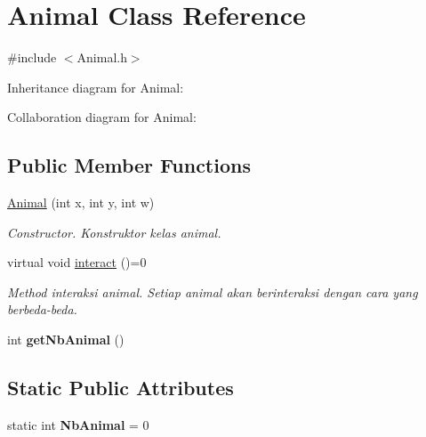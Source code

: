 \hypertarget{classAnimal}{}\section{Animal Class Reference}
\label{classAnimal}


{\ttfamily \#include $<$Animal.\+h$>$}



Inheritance diagram for Animal\+:


Collaboration diagram for Animal\+:
\subsection*{Public Member Functions}
\begin{DoxyCompactItemize}
\item 
\hyperlink{classAnimal_a38f8dc7a0844d03658f0cd5de482a5db}{Animal} (int x, int y, int w)\hypertarget{classAnimal_a38f8dc7a0844d03658f0cd5de482a5db}{}\label{classAnimal_a38f8dc7a0844d03658f0cd5de482a5db}

\begin{DoxyCompactList}\small\item\em Constructor. Konstruktor kelas animal. \end{DoxyCompactList}\item 
virtual void \hyperlink{classAnimal_af47626b050b665e9a19525227d2b840f}{interact} ()=0\hypertarget{classAnimal_af47626b050b665e9a19525227d2b840f}{}\label{classAnimal_af47626b050b665e9a19525227d2b840f}

\begin{DoxyCompactList}\small\item\em Method interaksi animal. Setiap animal akan berinteraksi dengan cara yang berbeda-\/beda. \end{DoxyCompactList}\item 
int {\bfseries get\+Nb\+Animal} ()\hypertarget{classAnimal_a654785ec6e23f33780711446eff77c81}{}\label{classAnimal_a654785ec6e23f33780711446eff77c81}

\end{DoxyCompactItemize}
\subsection*{Static Public Attributes}
\begin{DoxyCompactItemize}
\item 
static int {\bfseries Nb\+Animal} = 0\hypertarget{classAnimal_a828b89505d3cf5fee0e3042332a81e6e}{}\label{classAnimal_a828b89505d3cf5fee0e3042332a81e6e}

\end{DoxyCompactItemize}
